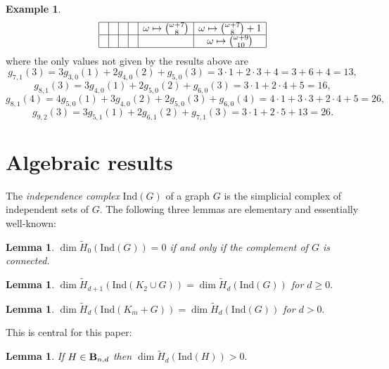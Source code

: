 \documentclass{article}
\theoremstyle{plain}
\newtheorem{lem}[thm]{Lemma}
\theoremstyle{definition}
\newtheorem{exa}{Example}
\begin{document}
\begin{exa}
\[\begin{array}{|c|c|c|c|c|c|}
    \hline &&&& \omega \mapsto {\omega+7 \choose 8}    & \omega \mapsto {\omega+7 \choose 8} +1 \\
     \hline &&&&&  \omega \mapsto {\omega+9 \choose 10}  \\
 \hline
 \end{array} \]
 where the only values not given by the results above are
 \[ g_{7,1}(3) =  3 g_{3,0}(1) + 2 g_{4,0}(2) +  g_{5,0}(3)  =  3\cdot 1 + 2 \cdot 3 + 4 = 3+6+4 = 13, \]
 \[ g_{8,1}(3) =  3 g_{4,0}(1) + 2 g_{5,0}(2) +  g_{6,0}(3)  = 3\cdot 1 + 2 \cdot 4 + 5 =  16, \]
 \[ g_{8,1}(4) =  4 g_{5,0}(1)  + 3 g_{4,0}(2) + 2 g_{5,0}(3) +  g_{6,0}(4) = 4\cdot 1 + 3 \cdot 3 + 2\cdot 4 + 5 = 26, \]
 \[ g_{9,2}(3) = 3 g_{5,1}(1) + 2 g_{6,1}(2) + g_{7,1}(3)= 3\cdot 1 +2\cdot 5 + 13 = 26. \]
 \end{exa}
 
\section{Algebraic results}

The \emph{independence complex} $\mathrm{Ind}(G)$ of a graph $G$ is the simplicial complex of independent sets of $G.$ The following three lemmas are elementary and essentially well-known:

\begin{lem} \label{indH0} $\dim \tilde{H}_0(\mathrm{Ind}(G)) = 0$ if and only if the complement of $G$ is connected.
\end{lem}

\begin{lem} \label{indSusp} $\dim \tilde{H}_{d+1}(\mathrm{Ind}(K_2 \cup G)) = \dim \tilde{H}_d(\mathrm{Ind}(G))$ for $d\geq 0.$
\end{lem}

\begin{lem} \label{indDisj} $\dim \tilde{H}_{d}(\mathrm{Ind}(K_m + G)) = \dim \tilde{H}_d(\mathrm{Ind}(G))$ for $d > 0.$
\end{lem}

This is central for this paper:

\begin{lem}\label{central1}
If $H \in {\bf B}_{n,d}$ then $\dim \tilde{H}_d(\mathrm{Ind}(H)) > 0.$
\end{lem}
\end{document}
